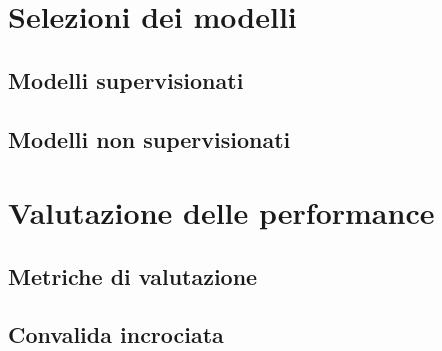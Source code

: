 \section{Selezioni dei modelli}
\subsection{Modelli supervisionati}
\subsection{Modelli non supervisionati}
\section{Valutazione delle performance}
\subsection{Metriche di valutazione}
\subsection{Convalida incrociata}
